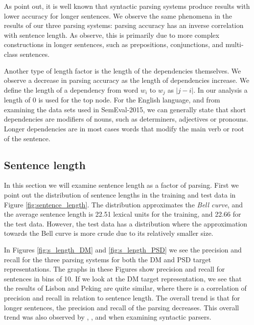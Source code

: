 As  point out, it is well known that syntactic parsing systems produce results with lower accuracy for longer sentences. We observe the same phenomena in the results of our three parsing systems: parsing accuracy has an inverse correlation with sentence length. As  observe, this is primarily due to more complex constructions in longer sentences, such as prepositions, conjunctions, and multi-class sentences.

Another type of length factor is the length of the dependencies themselves. We observe a decrease in parsing accuracy as the length of dependencies increase. We define the length of a dependency from word $w_i$ to $w_j$ as $|j - i|$. In our analysis a length of $0$ is used for the top node. For the English language, and from examining the data sets used in SemEval-2015, we can generally state that short dependencies are modifiers of nouns, such as determiners, adjectives or pronouns. Longer dependencies are in most cases words that modify the main verb or root of the sentence.

\subsection{Sentence length}

In this section we will examine sentence length as a factor of parsing. First we point out the distribution of sentence lengths in the training and test data in Figure \ref{fig:sentence_length}. The distribution approximates the \textit{Bell curve}, and the average sentence length is 22.51 lexical units for the training, and 22.66 for the test data. However, the test data has a distribution where the approximation towards the Bell curve is more crude due to its relatively smaller size.

In Figures \ref{fig:s_length_DM} and \ref{fig:s_length_PSD} we see the precision and recall for the three parsing systems for both the DM and PSD target representations. The graphs in these Figures show precision and recall for sentences in bins of 10. If we look at the DM target representation, we see that the results of Lisbon and Peking are quite similar, where there is a correlation of precision and recall in relation to sentence length. The overall trend is that for longer sentences, the precision and recall of the parsing decreases. This overall trend was also observed by , , and  when examining syntactic parsers.

